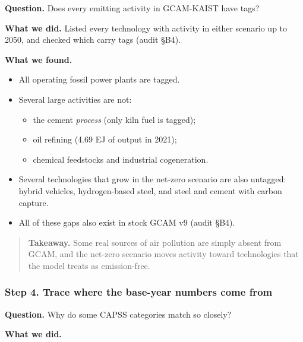 \textbf{Question.}
Does every
emitting
activity
in
GCAM-KAIST
have tags?

\textbf{What
we did.}
Listed
every
technology
with
activity
in either
scenario
up to
2050, and
checked
which
carry tags
(audit
§B4).

\textbf{What
we found.}

\begin{itemize}
\tightlist
\item
  All
  operating
  fossil
  power
  plants
  are
  tagged.
\item
  Several
  large
  activities
  are not:

  \begin{itemize}
  \tightlist
  \item
    the
    cement
    \emph{process}
    (only
    kiln
    fuel
    is
    tagged);
  \item
    oil
    refining
    (4.69
    EJ of
    output
    in
    2021);
  \item
    chemical
    feedstocks
    and
    industrial
    cogeneration.
  \end{itemize}
\item
  Several
  technologies
  that
  grow in
  the
  net-zero
  scenario
  are also
  untagged:
  hybrid
  vehicles,
  hydrogen-based
  steel,
  and
  steel
  and
  cement
  with
  carbon
  capture.
\item
  All of
  these
  gaps
  also
  exist in
  stock
  GCAM v9
  (audit
  §B4).
\end{itemize}

\begin{quote}
\plainmark{}
\textbf{Takeaway.}
Some real
sources of
air
pollution
are simply
absent
from GCAM,
and the
net-zero
scenario
moves
activity
toward
technologies
that the
model
treats as
emission-free.
\end{quote}

\hypertarget{step-4.-trace-where-the-base-year-numbers-come-from}{%
\subsubsection*{Step 4. Trace where the base-year numbers come from}\label{step-4.-trace-where-the-base-year-numbers-come-from}}

\textbf{Question.}
Why do
some CAPSS
categories
match so
closely?

\textbf{What
we did.}

